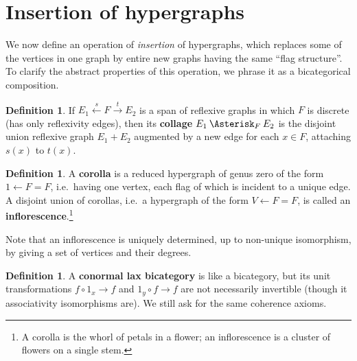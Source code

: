 \documentclass{article}
\theoremstyle{definition}
\newtheorem{defn}[thm]{Definition}
\theoremstyle{remark}
\let\ot\leftarrow
\let\xto\xrightarrow
\let\xot\xleftarrow
\def\coll{\mathbin{\Asterisk}}
\begin{document}
\section{Insertion of hypergraphs}
\label{sec:insertion}

We now define an operation of \emph{insertion} of hypergraphs, which replaces some of the vertices in one graph by entire new graphs having the same ``flag structure''.
To clarify the abstract properties of this operation, we phrase it as a bicategorical composition.

\begin{defn}
  If $E_1 \xot{s} F \xto{t} E_2$ is a span of reflexive graphs in which $F$ is discrete (has only reflexivity edges), then its \textbf{collage} $E_1 \coll_F E_2$ is the disjoint union reflexive graph $E_1+E_2$ augmented by a new edge for each $x\in F$, attaching $s(x)$ to $t(x)$.
\end{defn}

\begin{defn}
  A \textbf{corolla} is a reduced hypergraph of genus zero of the form $1 \ot F = F$, i.e.\ having one vertex, each flag of which is incident to a unique edge.
  A disjoint union of corollas, i.e.\ a hypergraph of the form $V \ot F = F$, is called an \textbf{inflorescence}.\footnote{A corolla is the whorl of petals in a flower; an inflorescence is a cluster of flowers on a single stem.}
\end{defn}

Note that an inflorescence is uniquely determined, up to non-unique isomorphism, by giving a set of vertices and their degrees.

\begin{defn}
  A \textbf{conormal lax bicategory} is like a bicategory, but its unit transformations $f \circ 1_x \to f$ and $1_y\circ f \to f$ are not necessarily invertible (though it associativity isomorphisms are).
  We still ask for the same coherence axioms.
\end{defn}
\end{document}
